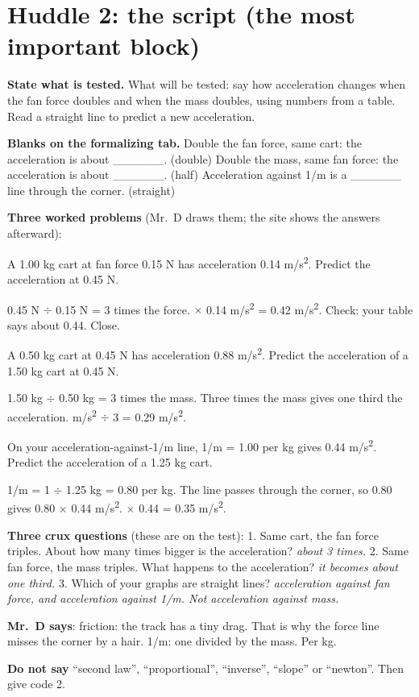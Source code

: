 \documentclass[10pt]{article}
\begin{document}
\section{Huddle 2: the script (the most important block)}
\textbf{State what is tested.} What will be tested: say how acceleration changes when the fan force doubles and when the mass doubles, using numbers from a table. Read a straight line to predict a new acceleration.\par
\textbf{Blanks on the formalizing tab.} Double the fan force, same cart: the acceleration is about \_\_\_\_\_\_. (double) \quad Double the mass, same fan force: the acceleration is about \_\_\_\_\_\_. (half) \quad Acceleration against 1/m is a \_\_\_\_\_\_ line through the corner. (straight)\par
\textbf{Three worked problems} (Mr.\ D draws them; the site shows the answers afterward):
\begin{description}[leftmargin=2em]
\item[\textbf{W1}] A 1.00 kg cart at fan force 0.15 N has acceleration 0.14 m/s\textsuperscript{2}. Predict the acceleration at 0.45 N.\par 0.45 N $\div$ 0.15 N = 3 times the force.  $\times$ 0.14 m/s\textsuperscript{2} = 0.42 m/s\textsuperscript{2}. \quad Check: your table says about 0.44. Close.
\item[\textbf{W2}] A 0.50 kg cart at 0.45 N has acceleration 0.88 m/s\textsuperscript{2}. Predict the acceleration of a 1.50 kg cart at 0.45 N.\par 1.50 kg $\div$ 0.50 kg = 3 times the mass. \quad Three times the mass gives one third the acceleration.  m/s\textsuperscript{2} $\div$ 3 = 0.29 m/s\textsuperscript{2}.
\item[\textbf{W3}] On your acceleration-against-1/m line, 1/m = 1.00 per kg gives 0.44 m/s\textsuperscript{2}. Predict the acceleration of a 1.25 kg cart.\par 1/m = 1 $\div$ 1.25 kg = 0.80 per kg. \quad The line passes through the corner, so 0.80 gives 0.80 $\times$ 0.44 m/s\textsuperscript{2}.  $\times$ 0.44 = 0.35 m/s\textsuperscript{2}.
\end{description}
\textbf{Three crux questions} (these are on the test): 1. Same cart, the fan force triples. About how many times bigger is the acceleration? \textit{about 3 times.} 2. Same fan force, the mass triples. What happens to the acceleration? \textit{it becomes about one third.} 3. Which of your graphs are straight lines? \textit{acceleration against fan force, and acceleration against 1/m. Not acceleration against mass.}\par
\textbf{Mr.\ D says}: friction: the track has a tiny drag. That is why the force line misses the corner by a hair. 1/m: one divided by the mass. Per kg.\par
\textbf{Do not say} “second law”, “proportional”, “inverse”, “slope” or “newton”. Then give code 2.
\end{document}
